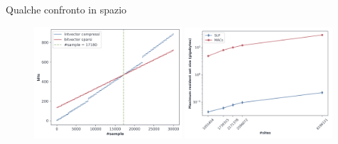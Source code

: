 \documentclass[]{beamer}
\begin{document}
\begin{frame}{Qualche confronto in spazio}
  \begin{figure}[H]
    \centering
    \includegraphics[width=0.49\textwidth]{img/bv_vs_iv.png}
    \includegraphics[width=0.49\textwidth]{img/slp_vs_macs_log.png}

  \end{figure}
\end{frame}
\end{document}
